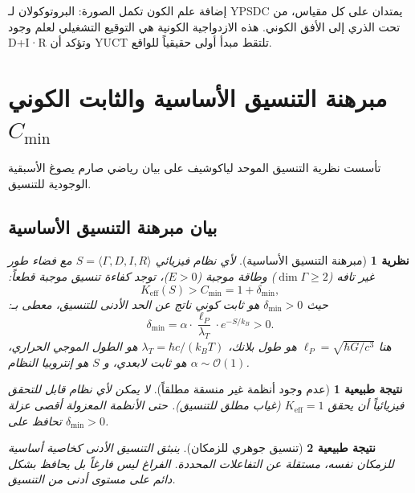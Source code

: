 \documentclass[11pt,a4paper]{article}
\newtheorem{theorem}{نظرية}
\newtheorem{corollary}{نتيجة طبيعية}
\begin{document}
	\noindent
	إضافة علم الكون تكمل الصورة: البروتوكولان لـ YPSDC يمتدان على كل مقياس، من تحت الذري إلى الأفق الكوني. هذه الازدواجية الكونية هي التوقيع التشغيلي لعلم وجود D+I·R وتؤكد أن YUCT تلتقط مبدأ أولى حقيقياً للواقع.
	
	\section{مبرهنة التنسيق الأساسية والثابت الكوني \texorpdfstring{$C_{\min}$}{C\_min}}
	\label{sec:fundamental-theorem}
	
	تأسست نظرية التنسيق الموحد لياكوشيف على بيان رياضي صارم يصوغ الأسبقية الوجودية للتنسيق.
	
	\subsection{بيان مبرهنة التنسيق الأساسية}
	
	\begin{theorem}[مبرهنة التنسيق الأساسية]
		لأي نظام فيزيائي $S = \langle \Gamma, D, I, R \rangle$ مع فضاء طور غير تافه ($\dim\Gamma \geq 2$) وطاقة موجبة ($E > 0$)، توجد كفاءة تنسيق موجبة قطعاً:
		\begin{equation}
			\boxed{K_{\mathrm{eff}}(S) > C_{\min} = 1 + \delta_{\min}},
		\end{equation}
		حيث $\delta_{\min} > 0$ هو ثابت كوني ناتج عن الحد الأدنى للتنسيق، معطى بـ:
		\begin{equation}
			\delta_{\min} = \alpha \cdot \frac{\ell_P}{\lambda_T} \cdot e^{-S/k_B} > 0.
			\label{eq:delta-min}
		\end{equation}
		هنا $\ell_P = \sqrt{\hbar G / c^3}$ هو طول بلانك، $\lambda_T = \hbar c / (k_B T)$ هو الطول الموجي الحراري، $\alpha \sim \mathcal{O}(1)$ هو ثابت لابعدي، و $S$ هو إنتروبيا النظام.
	\end{theorem}
	
	\begin{corollary}[عدم وجود أنظمة غير منسقة مطلقاً]
		لا يمكن لأي نظام قابل للتحقق فيزيائياً أن يحقق $K_{\mathrm{eff}} = 1$ (غياب مطلق للتنسيق). حتى الأنظمة المعزولة أقصى عزلة تحافظ على $\delta_{\min} > 0$.
	\end{corollary}
	
	\begin{corollary}[تنسيق جوهري للزمكان]
		ينبثق التنسيق الأدنى كخاصية أساسية للزمكان نفسه، مستقلة عن التفاعلات المحددة. الفراغ ليس فارغاً بل يحافظ بشكل دائم على مستوى أدنى من التنسيق.
	\end{corollary}
	
\end{document}
